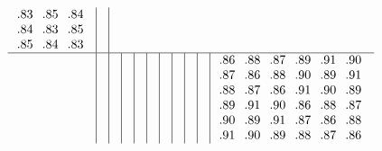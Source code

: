 \documentclass[10pt,a4paper,landscape]{amsart}
\begin{document}
\begin{align*}
\begin{array}{c|c|c|c|c|c|c|c|c|c|c}
\begin{array}{rrr}
\llap.83&\llap.85&\llap.84\\%
\llap.84&\llap.83&\llap.85\\%
\llap.85&\llap.84&\llap.83\\%
\end{array}%
&\\\hline
&&&&&&&&&&
\begin{array}{rrrrrr}%
\llap.86&\llap.88&\llap.87&\llap.89&\llap.91&\llap.90\\%
\llap.87&\llap.86&\llap.88&\llap.90&\llap.89&\llap.91\\%
\llap.88&\llap.87&\llap.86&\llap.91&\llap.90&\llap.89\\%
\llap.89&\llap.91&\llap.90&\llap.86&\llap.88&\llap.87\\%
\llap.90&\llap.89&\llap.91&\llap.87&\llap.86&\llap.88\\%
\llap.91&\llap.90&\llap.89&\llap.88&\llap.87&\llap.86\\%
\end{array}%
\end{array}
\end{align*}
\end{document}
